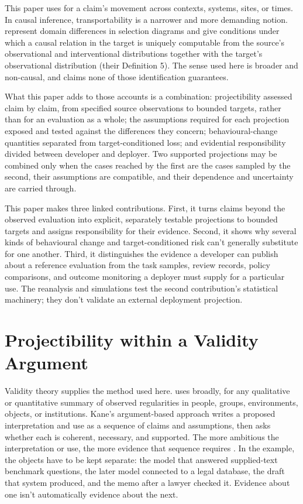 \documentclass[12pt]{article}
\begin{document}
This paper uses  for a claim's movement across contexts, systems, sites, or times. In causal inference, transportability is a narrower and more demanding notion. \Textcite{pearlBareinboim2014transportability} represent domain differences in selection diagrams and give conditions under which a causal relation in the target is uniquely computable from the source's observational and interventional distributions together with the target's observational distribution (their Definition 5). The sense used here is broader and non-causal, and claims none of those identification guarantees.

What this paper adds to those accounts is a combination: projectibility assessed claim by claim, from specified source observations to bounded targets, rather than for an evaluation as a whole; the assumptions required for each projection exposed and tested against the differences they concern; behavioural-change quantities separated from target-conditioned loss; and evidential responsibility divided between developer and deployer. Two supported projections may be combined only when the cases reached by the first are the cases sampled by the second, their assumptions are compatible, and their dependence and uncertainty are carried through.

This paper makes three linked contributions. First, it turns claims beyond the observed evaluation into explicit, separately testable projections to bounded targets and assigns responsibility for their evidence. Second, it shows why several kinds of behavioural change and target-conditioned risk can't generally substitute for one another. Third, it distinguishes the evidence a developer can publish about a reference evaluation from the task samples, review records, policy comparisons, and outcome monitoring a deployer must supply for a particular use. The reanalysis and simulations test the second contribution's statistical machinery; they don't validate an external deployment projection.

\section{Projectibility within a Validity Argument}\label{sec:projection}

Validity theory supplies the method used here. \Textcite[741]{messick1995Validity} uses  broadly, for any qualitative or quantitative summary of observed regularities in people, groups, environments, objects, or institutions. Kane's argument-based approach writes a proposed interpretation and use as a sequence of claims and assumptions, then asks whether each is coherent, necessary, and supported. The more ambitious the interpretation or use, the more evidence that sequence requires \citep[1--3]{kane2013validating}. In the example, the objects have to be kept separate: the model that answered supplied-text benchmark questions, the later model connected to a legal database, the draft that system produced, and the memo after a lawyer checked it. Evidence about one isn't automatically evidence about the next.
\end{document}
